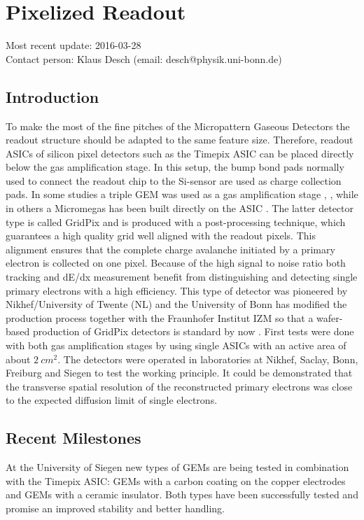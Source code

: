 \section{Pixelized Readout}
\label{chap:TPC_sec:pixels}
Most recent update: 2016-03-28 \\
Contact person: Klaus Desch (email: desch@physik.uni-bonn.de)\\

\subsection{Introduction}
To make the most of the fine pitches of the Micropattern Gaseous Detectors the
readout structure should be adapted to the same feature size. Therefore,
readout ASICs of silicon pixel detectors such as the Timepix ASIC
\cite{Llopart2007485,Llopart2008106} can be placed directly below the gas amplification
stage. In this setup, the bump bond pads normally used to connect the readout
chip to the Si-sensor are used as charge collection pads. In some studies a
triple GEM was used as a gas amplification stage \cite{Bamberger:2006xp},
\cite{6359808}, while in others a Micromegas has been built
directly on the ASIC \cite{Chefdeville2006490}. The latter detector type is
 called GridPix and is produced with a post-processing technique, which
 guarantees a high quality grid well aligned with the readout pixels. This
 alignment ensures that the complete charge avalanche initiated by a primary
 electron is collected on one pixel. Because of the high signal to noise
 ratio both tracking and dE/dx measurement benefit from distinguishing and
 detecting single primary electrons with a high efficiency. This type of
 detector was pioneered by Nikhef/University of Twente (NL) and the University
 of Bonn has modified the
 production process together with the Fraunhofer Institut IZM so that a
 wafer-based production of GridPix detectors is standard by now
 \cite{Koppert2013245}. First tests were done with both
 gas amplification stages by using single ASICs with an active area of about $\SI{2}{cm^2}$. The detectors were operated in laboratories at Nikhef, Saclay, Bonn,
 Freiburg and Siegen to test the working principle. It could be demonstrated
 that the transverse spatial resolution of the reconstructed primary electrons
 was close to the expected diffusion limit of single electrons.


\subsection{Recent Milestones}
At the University of Siegen new types of GEMs are being tested in combination
with the Timepix ASIC: GEMs with a
carbon coating on the copper electrodes and GEMs with a ceramic
insulator. Both types have been successfully tested and promise an improved
stability and better handling.

